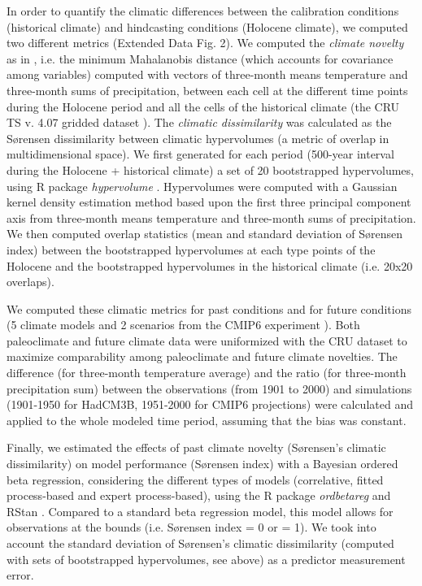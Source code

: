 \documentclass[pdflatex, sn-nature]{sn-jnl}%
\begin{document}
In order to quantify the climatic differences between the calibration conditions (historical climate) and hindcasting conditions (Holocene climate), we computed two different metrics (Extended Data Fig. 2).
We computed the \emph{climate novelty} as in \cite{Burke2019}, i.e. the minimum Mahalanobis distance (which accounts for covariance among variables) computed with vectors of three-month means temperature and three-month sums of precipitation, between each cell at the different time points during the Holocene period and all the cells of the historical climate (the CRU TS v. 4.07 gridded dataset \citep{Harris2020}). 
The \emph{climatic dissimilarity} was calculated as the Sørensen dissimilarity between climatic hypervolumes (a metric of overlap in multidimensional space). We first generated for each period (500-year interval during the Holocene + historical climate) a set of 20 bootstrapped hypervolumes, using R package \emph{hypervolume} \cite{Blonder2018}. Hypervolumes were computed with a Gaussian kernel density estimation method based upon the first three principal component axis from three-month means temperature and three-month sums of precipitation. We then computed overlap statistics (mean and standard deviation of Sørensen index) between the bootstrapped hypervolumes at each type points of the Holocene and the bootstrapped hypervolumes in the historical climate (i.e. 20x20 overlaps).

We computed these climatic metrics for past conditions and for future conditions (5 climate models and 2 scenarios from the CMIP6 experiment \citep{Noel2022}). Both paleoclimate and future climate data were uniformized with the CRU dataset to maximize comparability among paleoclimate and future climate novelties. The difference (for three-month temperature average) and the ratio (for three-month precipitation sum) between the observations (from 1901 to 2000) and simulations (1901-1950 for HadCM3B, 1951-2000 for CMIP6 projections) were calculated and applied to the whole modeled time period, assuming that the bias was constant.  

Finally, we estimated the effects of past climate novelty (Sørensen's climatic dissimilarity) on model performance (Sørensen index) with a Bayesian ordered beta regression, considering the different types of models (correlative, fitted process-based and expert process-based), using the R package \emph{ordbetareg} \cite{Kubinec2023} and RStan \cite{SDT2023}.
Compared to a  standard beta regression model, this model allows for observations at the bounds (i.e. Sørensen index = 0 or = 1). We took into account the standard deviation of Sørensen's climatic dissimilarity (computed with sets of bootstrapped hypervolumes, see above) as a predictor measurement error.
\end{document}
